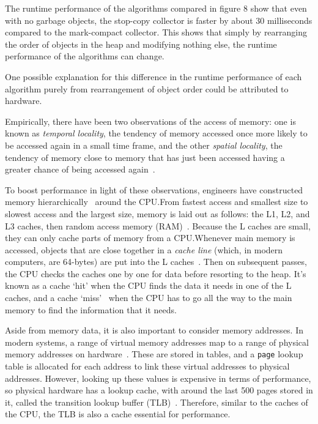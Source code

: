 \documentclass[index]{subfiles}
\begin{document}
The runtime performance of the algorithms compared in figure 8 show that even with no garbage objects, the stop-copy collector is faster by about 30 milliseconds compared to the mark-compact collector. This shows that simply by rearranging the order of objects in the heap and modifying nothing else, the runtime performance of the algorithms can change.

One possible explanation for this difference in the runtime performance of each algorithm purely from rearrangement of object order could be attributed to hardware.

Empirically, there have been two observations of the access of memory: one is known as \textit{temporal locality}, the tendency of memory accessed once more likely to be accessed again in a small time frame, and the other \textit{spatial locality}, the tendency of memory close to memory that has just been accessed having a greater chance of being accessed again~\parencite[18:21]{oracledevelopersCachingUnderstandMeasure2015}.

To boost performance in light of these observations, engineers have constructed memory hierarchically~\parencite{simondevCanJavaScriptGo2021} around the CPU.\@ From fastest access and smallest size to slowest access and the largest size, memory is laid out as follows: the L1, L2, and L3 caches, then random access memory (RAM)~\parencite{simondevCanJavaScriptGo2021}. Because the L caches are small, they can only cache parts of memory from a CPU.\@ Whenever main memory is accessed, objects that are close together in a \textit{cache line} (which, in modern computers, are 64-bytes) are put into the L caches~\parencites{simondevCanJavaScriptGo2021}{code_project}. Then on subsequent passes, the CPU checks the caches one by one for data before resorting to the heap. It's known as a cache `hit' when the CPU finds the data it needs in one of the L caches, and a cache `miss'~\parencite{simondevCanJavaScriptGo2021} when the CPU has to go all the way to the main memory to find the information that it needs.

Aside from memory data, it is also important to consider memory addresses. In modern systems, a range of virtual memory addresses map to a range of physical memory addresses on hardware~\parencites{code_project}[31:29]{oracledevelopersCachingUnderstandMeasure2015}. These are stored in tables, and a \verb+page+ lookup table is allocated for each address to link these virtual addresses to physical addresses. However, looking up these values is expensive in terms of performance, so physical hardware has a lookup cache, with around the last 500 pages stored in it, called the transition lookup buffer (TLB)~\parencites{code_project}[32:42]{oracledevelopersCachingUnderstandMeasure2015}. Therefore, similar to the caches of the CPU, the TLB is also a cache essential for performance.
\end{document}

